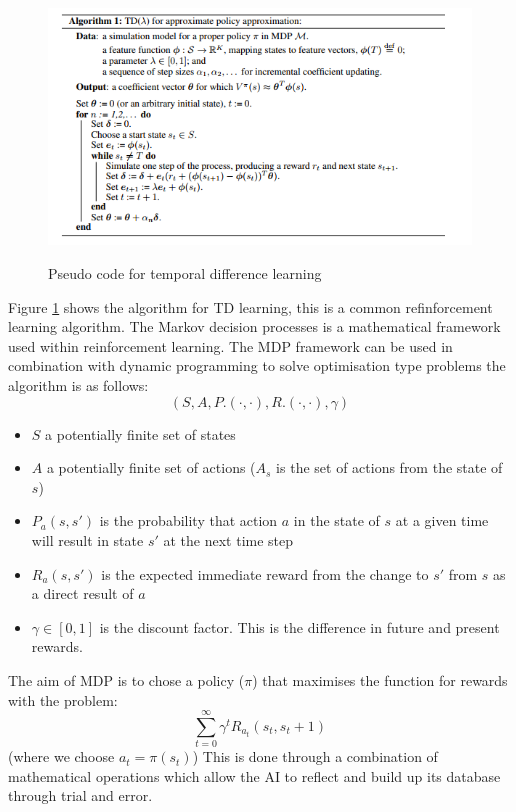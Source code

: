 \documentclass[10pt,a4paper]{scrartcl}
\begin{document}
\begin{figure}[H]
	\begin{center}
		\includegraphics[width=1\textwidth] {pseudoCodeTDLearning.png}
		\caption{Pseudo code for temporal difference learning}
		\cite{TDLearningPseudoCode}
		\label{TemporalDifferenceLearningPseudoCode}
	\end{center}
\end{figure}
Figure \ref{TemporalDifferenceLearningPseudoCode} shows the algorithm for TD learning, this is a common refinforcement learning algorithm.
The Markov decision processes is a mathematical framework used within reinforcement learning. The MDP framework can be used in combination with dynamic programming to solve optimisation type problems the algorithm is as follows:
$$
(S, A, P.(\cdot,\cdot), R.(\cdot , \cdot), \gamma) 
$$
\begin{itemize}
	\item $S$ a potentially finite set of states
	\item $A$ a potentially finite set of actions ($A_{s}$ is the set of actions from the state of $s$)
	\item $P_{a}(s,s')$ is the probability that action $a$ in the state of $s$ at a given time will result in state $s'$ at the next time step
	\item$R_{a}(s,s')$ is the expected immediate reward from the change to $s'$ from $s$ as a direct result of $a$
	\item $\gamma \in [0,1] $ is the discount factor. This is the difference in future and present rewards.
\end{itemize}
The aim of MDP is to chose a policy ($\pi$) that maximises the function for rewards with the problem:
$$
\sum_{t=0}^{\infty} \gamma^{t}R_{a_{t}}(s_{t},s_{t}+1) 
$$
(where we choose $a_{t} = \pi(s_{t})$) \cite{MDP}
This is done through a combination of mathematical operations which allow the AI to reflect and build up its database through trial and error.
\end{document}
